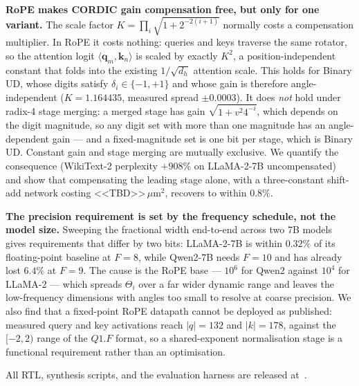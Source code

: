 \textbf{RoPE makes CORDIC gain compensation free, but only for one variant.}
The scale factor $K = \prod_i \sqrt{1 + 2^{-2(i+1)}}$ normally costs a
compensation multiplier. In RoPE it costs nothing: queries and keys traverse
the same rotator, so the attention logit $\langle \mathbf{q}_m, \mathbf{k}_n
\rangle$ is scaled by exactly $K^2$, a position-independent constant that folds
into the existing $1/\sqrt{d_h}$ attention scale. This holds for Binary UD,
whose digits satisfy $\delta_i \in \{-1,+1\}$ and whose gain is therefore
angle-independent ($K = 1.164435$, measured spread $\pm 0.0003$). It does
\emph{not} hold under radix-4 stage merging: a merged stage has gain
$\sqrt{1 + v^2 4^{-i}}$, which depends on the digit magnitude, so any digit set
with more than one magnitude has an angle-dependent gain --- and a
fixed-magnitude set is one bit per stage, which is Binary UD. Constant gain and
stage merging are mutually exclusive. We quantify the consequence
(WikiText-2 perplexity $+908\%$ on LLaMA-2-7B uncompensated) and show that
compensating the leading stage alone, with a three-constant shift-add network
costing <<TBD>>\,$\mu$m$^2$, recovers to within $0.8\%$.

\textbf{The precision requirement is set by the frequency schedule, not the
model size.} Sweeping the fractional width end-to-end across two 7B models
gives requirements that differ by two bits: LLaMA-2-7B is within $0.32\%$ of
its floating-point baseline at $F = 8$, while Qwen2-7B needs $F = 10$ and has
already lost $6.4\%$ at $F = 9$. The cause is the RoPE base --- $10^6$ for
Qwen2 against $10^4$ for LLaMA-2 --- which spreads $\Theta_i$ over a far wider
dynamic range and leaves the low-frequency dimensions with angles too small to
resolve at coarse precision. We also find that a fixed-point RoPE datapath
cannot be deployed as published: measured query and key activations reach
$|q| = 132$ and $|k| = 178$, against the $[-2, 2)$ range of the $Q1.F$ format,
so a shared-exponent normalisation stage is a functional requirement rather
than an optimisation.

All RTL, synthesis scripts, and the evaluation harness are released
at~\cite{repo}.
